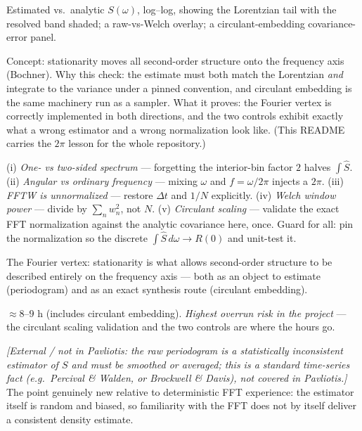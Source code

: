 \documentclass[11pt]{article}
\newcommand{\extnote}[1]{{\small\color{extgray}\emph{[External / not in Pavliotis: #1]}}}
\newenvironment{unitmeta}{%
  \begin{description}[style=sameline,leftmargin=1.4cm,font=\bfseries\color{hubblue}]
}{%
  \end{description}
}
\begin{document}
\begin{unitmeta}
\item[Artifact] Estimated vs.\ analytic $S(\omega)$, log--log, showing the Lorentzian tail with the resolved band shaded; a raw-vs-Welch overlay; a circulant-embedding covariance-error panel.
\item[README] Concept: stationarity moves all second-order structure onto the frequency axis (Bochner). Why this check: the estimate must both match the Lorentzian \emph{and} integrate to the variance under a pinned convention, and circulant embedding is the same machinery run as a sampler. What it proves: the Fourier vertex is correctly implemented in both directions, and the two controls exhibit exactly what a wrong estimator and a wrong normalization look like. (This README carries the $2\pi$ lesson for the whole repository.)
\item[Missteps] (i) \emph{One- vs two-sided spectrum} --- forgetting the interior-bin factor $2$ halves $\int\widehat S$. (ii) \emph{Angular vs ordinary frequency} --- mixing $\omega$ and $f=\omega/2\pi$ injects a $2\pi$. (iii) \emph{FFTW is unnormalized} --- restore $\Delta t$ and $1/N$ explicitly. (iv) \emph{Welch window power} --- divide by $\sum_n w_n^2$, not $N$. (v) \emph{Circulant scaling} --- validate the exact FFT normalization against the analytic covariance here, once. Guard for all: pin the normalization so the discrete $\int\widehat S\,d\omega\to R(0)$ and unit-test it.
\item[Purpose] The Fourier vertex: stationarity is what allows second-order structure to be described entirely on the frequency axis --- both as an object to estimate (periodogram) and as an exact synthesis route (circulant embedding).
\item[Effort] $\approx 8$--$9$ h (includes circulant embedding). \emph{Highest overrun risk in the project} --- the circulant scaling validation and the two controls are where the hours go.
\item[Prerequisite] \extnote{the raw periodogram is a statistically \emph{inconsistent} estimator of $S$ and must be smoothed or averaged; this is a standard time-series fact (e.g.\ Percival \& Walden, or Brockwell \& Davis), not covered in Pavliotis.} The point genuinely new relative to deterministic FFT experience: the estimator itself is random and biased, so familiarity with the FFT does not by itself deliver a consistent density estimate.
\end{unitmeta}
\end{document}
